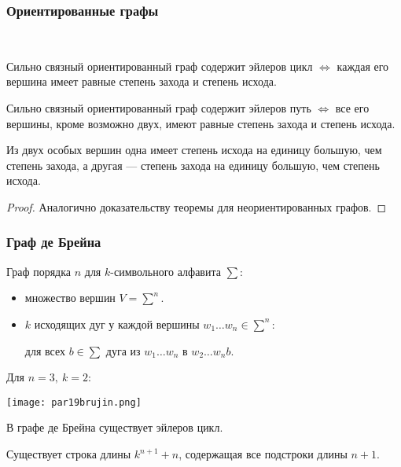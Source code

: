 \subsubsection*{Ориентированные графы}

\begin{theorem}~

    Сильно связный ориентированный граф содержит эйлеров цикл $\iff$ каждая его вершина имеет равные степень захода и степень исхода.

    Сильно связный ориентированный граф содержит эйлеров путь $\iff$ все его вершины, кроме возможно двух, имеют равные степень захода и степень исхода.

    Из двух особых вершин одна имеет степень исхода на единицу большую, чем степень захода, а другая --- степень захода на единицу большую, чем степень исхода.
\end{theorem}

\begin{proof}
    Аналогично доказательству теоремы для неориентированных графов.
\end{proof}

\subsubsection*{Граф де Брейна}

Граф порядка $n$ для $k$-символьного алфавита $\sum$:

\begin{itemize}
    \item множество вершин $V = \sum^n$.
    
    \item $k$ исходящих дуг у каждой вершины $w_1 \ldots w_n \in \sum^n$:
    
    для всех $b \in \sum$ дуга из $w_1 \ldots w_n$ в $w_2 \ldots w_n b$.
\end{itemize}

Для $n = 3,~k = 2$:

\begin{center}
    \texttt{[image: par19brujin.png]}
\end{center}

\begin{theorem}
    В графе де Брейна существует эйлеров цикл.

    Существует строка длины $k^{n+1} + n$, содержащая все подстроки длины $n + 1$.
\end{theorem}

